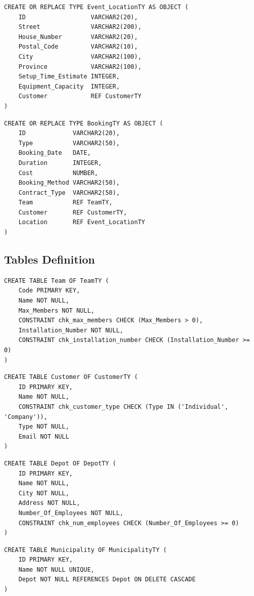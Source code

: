 \begin{lstlisting}
CREATE OR REPLACE TYPE Event_LocationTY AS OBJECT (
    ID                  VARCHAR2(20),
    Street              VARCHAR2(200),
    House_Number        VARCHAR2(20),
    Postal_Code         VARCHAR2(10),
    City                VARCHAR2(100),
    Province            VARCHAR2(100),
    Setup_Time_Estimate INTEGER,
    Equipment_Capacity  INTEGER,
    Customer            REF CustomerTY
)
\end{lstlisting}

\begin{lstlisting}
CREATE OR REPLACE TYPE BookingTY AS OBJECT (
    ID             VARCHAR2(20),
    Type           VARCHAR2(50),
    Booking_Date   DATE,
    Duration       INTEGER,
    Cost           NUMBER,
    Booking_Method VARCHAR2(50),
    Contract_Type  VARCHAR2(50),
    Team           REF TeamTY,
    Customer       REF CustomerTY,
    Location       REF Event_LocationTY
)
\end{lstlisting}

\subsection{Tables Definition}

\begin{lstlisting}
CREATE TABLE Team OF TeamTY (
    Code PRIMARY KEY,
    Name NOT NULL,
    Max_Members NOT NULL,
    CONSTRAINT chk_max_members CHECK (Max_Members > 0),
    Installation_Number NOT NULL,
    CONSTRAINT chk_installation_number CHECK (Installation_Number >= 0)
)
\end{lstlisting}

\begin{lstlisting}
CREATE TABLE Customer OF CustomerTY (
    ID PRIMARY KEY,
    Name NOT NULL,
    CONSTRAINT chk_customer_type CHECK (Type IN ('Individual', 'Company')),
    Type NOT NULL,
    Email NOT NULL
)
\end{lstlisting}

\begin{lstlisting}
CREATE TABLE Depot OF DepotTY (
    ID PRIMARY KEY,
    Name NOT NULL,
    City NOT NULL,
    Address NOT NULL,
    Number_Of_Employees NOT NULL,
    CONSTRAINT chk_num_employees CHECK (Number_Of_Employees >= 0)
)
\end{lstlisting}

\begin{lstlisting}
CREATE TABLE Municipality OF MunicipalityTY (
    ID PRIMARY KEY,
    Name NOT NULL UNIQUE,
    Depot NOT NULL REFERENCES Depot ON DELETE CASCADE
)
\end{lstlisting}

